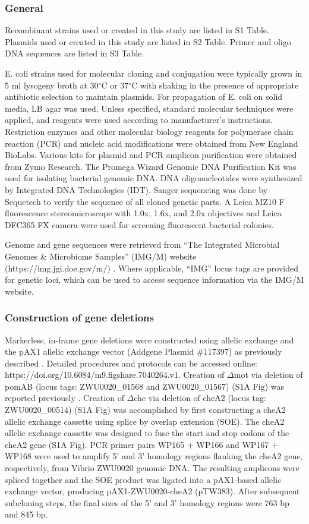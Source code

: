 \subsubsection{General}
Recombinant strains used or created in this study are listed in S1 Table. Plasmids used or created in this study are listed in S2 Table. Primer and oligo DNA sequences are listed in S3 Table. 

E. coli strains used for molecular cloning and conjugation were typically grown in 5 ml lysogeny broth at 30$^\circ$C or 37$^\circ$C with shaking in the presence of appropriate antibiotic selection to maintain plasmids. For propagation of E. coli on solid media, LB agar was used. Unless specified, standard molecular techniques were applied, and reagents were used according to manufacturer's instructions. Restriction enzymes and other molecular biology reagents for polymerase chain reaction (PCR) and nucleic acid modifications were obtained from New England BioLabs. Various kits for plasmid and PCR amplicon purification were obtained from Zymo Research. The Promega Wizard Genomic DNA Purification Kit was used for isolating bacterial genomic DNA. DNA oligonucleotides were synthesized by Integrated DNA Technologies (IDT). Sanger sequencing was done by Sequetech to verify the sequence of all cloned genetic parts. A Leica MZ10 F fluorescence stereomicroscope with 1.0x, 1.6x, and 2.0x objectives and Leica DFC365 FX camera were used for screening fluorescent bacterial colonies. 

Genome and gene sequences were retrieved from ``The Integrated Microbial Genomes \& Microbiome Samples'' (IMG/M) website (https://img.jgi.doe.gov/m/) \cite{chen_imgm_2017}. Where applicable, ``IMG'' locus tags are provided for genetic loci, which can be used to access sequence information via the IMG/M website. 

\subsubsection{Construction of gene deletions}
Markerless, in-frame gene deletions were constructed using allelic exchange and the pAX1 allelic exchange vector (Addgene Plasmid \#117397) as previously described \cite{wiles_modernized_2018}. Detailed procedures and protocols can be accessed online: https://doi.org/10.6084/m9.figshare.7040264.v1. Creation of $\Delta$mot via deletion of pomAB (locus tags: ZWU0020\_01568 and ZWU0020\_01567) (S1A Fig) was reported previously \cite{wiles_modernized_2018}. Creation of $\Delta$che via deletion of cheA2 (locus tag: ZWU0020\_00514) (S1A Fig) was accomplished by first constructing a cheA2 allelic exchange cassette using splice by overlap extension (SOE). The cheA2 allelic exchange cassette was designed to fuse the start and stop codons of the cheA2 gene (S1A Fig). PCR primer pairs WP165 + WP166 and WP167 + WP168 were used to amplify 5' and 3' homology regions flanking the cheA2 gene, respectively, from Vibrio ZWU0020 genomic DNA. The resulting amplicons were spliced together and the SOE product was ligated into a pAX1-based allelic exchange vector, producing pAX1-ZWU0020-cheA2 (pTW383). After subsequent subcloning steps, the final sizes of the 5' and 3' homology regions were 763 bp and 845 bp.   

